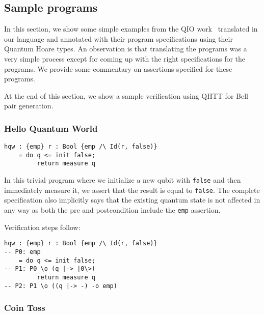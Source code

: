 \documentclass[acmsmall,nonacm,timestamp,review=false,anonymous=false]{acmart}
\begin{document}
\subsection{Sample programs}
\label{sec:examples}

In this section, we show some simple examples from the QIO work~\cite{qio} translated in our language and annotated with their program specifications using their Quantum Hoare types. An observation is that translating the programs was a very simple process except for coming up with the right specifications for the programs. We provide some commentary on assertions specified for these programs.

At the end of this section, we show a sample verification using QHTT for Bell pair generation.

\subsubsection{Hello Quantum World}
\leavevmode

\begin{minipage}{0.95\linewidth}
\begin{lstlisting}[language=QHaskell]
hqw : {emp} r : Bool {emp /\ Id(r, false)}
    = do q <= init false;
         return measure q
\end{lstlisting}
\end{minipage}

In this trivial program where we initialize a new qubit with \texttt{false} and then immediately measure it, we assert that the result is equal to \texttt{false}. The complete specification also implicitly says that the existing quantum state is not affected in any way as both the pre and postcondition include the \texttt{emp} assertion.

Verification steps follow:

\begin{minipage}{0.95\linewidth}
\begin{lstlisting}[language=QHaskell]
hqw : {emp} r : Bool {emp /\ Id(r, false)}
-- P0: emp
    = do q <= init false;
-- P1: P0 \o (q |-> |0\>)
         return measure q
-- P2: P1 \o ((q |-> -) -o emp)
\end{lstlisting}
\end{minipage}

\subsubsection{Coin Toss}
\leavevmode
\end{document}
